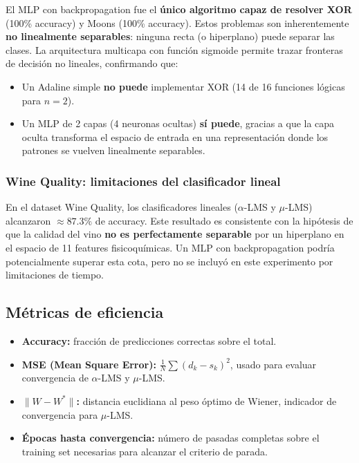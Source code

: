 \documentclass[12pt,a4paper]{article}
\newcommand{\norm}[1]{\lVert#1\rVert}
\begin{document}
El MLP con backpropagation fue el \textbf{único algoritmo capaz de resolver XOR} (100\% accuracy) y Moons (100\% accuracy). Estos problemas son inherentemente \textbf{no linealmente separables}: ninguna recta (o hiperplano) puede separar las clases. La arquitectura multicapa con función sigmoide permite trazar fronteras de decisión no lineales, confirmando que:
\begin{itemize}[leftmargin=*]
    \item Un Adaline simple \textbf{no puede} implementar XOR (14 de 16 funciones lógicas para $n=2$).
    \item Un MLP de 2 capas (4 neuronas ocultas) \textbf{sí puede}, gracias a que la capa oculta transforma el espacio de entrada en una representación donde los patrones se vuelven linealmente separables.
\end{itemize}

\subsubsection{Wine Quality: limitaciones del clasificador lineal}

En el dataset Wine Quality, los clasificadores lineales ($\alpha$-LMS y $\mu$-LMS) alcanzaron $\approx 87.3\%$ de accuracy. Este resultado es consistente con la hipótesis de que la calidad del vino \textbf{no es perfectamente separable} por un hiperplano en el espacio de 11 features fisicoquímicas. Un MLP con backpropagation podría potencialmente superar esta cota, pero no se incluyó en este experimento por limitaciones de tiempo.

\subsection{Métricas de eficiencia}

\begin{itemize}[leftmargin=*]
    \item \textbf{Accuracy:} fracción de predicciones correctas sobre el total.
    \item \textbf{MSE (Mean Square Error):} $\frac{1}{N}\sum (d_k - s_k)^2$, usado para evaluar convergencia de $\alpha$-LMS y $\mu$-LMS.
    \item \textbf{$\norm{W - W^*}$:} distancia euclidiana al peso óptimo de Wiener, indicador de convergencia para $\mu$-LMS.
    \item \textbf{Épocas hasta convergencia:} número de pasadas completas sobre el training set necesarias para alcanzar el criterio de parada.
\end{itemize}
\end{document}
